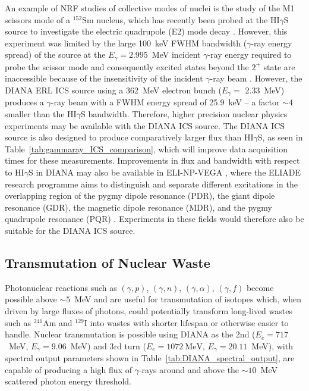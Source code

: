 \documentclass[../main.tex]{subfiles}
\begin{document}
An example of NRF studies of collective modes of nuclei is the study of the M1 scissors mode of a $^{152}\textrm{Sm}$ nucleus, which has recently been probed at the HI$\gamma$S source to investigate the electric quadrupole (E2) mode decay \cite{ide20212}. However, this experiment was limited by the large 100~\si{\kilo\electronvolt} FWHM bandwidth ($\gamma$-ray energy spread) \cite{ide20212} of the source at the $E_{\gamma} = 2.995$~\si{\mega\electronvolt} incident $\gamma$-ray energy required to probe the scissor mode \cite{ziegler1993low} and consequently excited states beyond the $2^{+}$ state are inaccessible because of the insensitivity of the incident $\gamma$-ray beam \cite{ide20212}. However, the DIANA ERL ICS source using a 362~\si{\mega\electronvolt} electron bunch ($E_{\gamma} =$ 2.33~\si{\mega\electronvolt}) produces a $\gamma$-ray beam with a FWHM energy spread of 25.9~\si{\kilo\electronvolt} -- a factor $\sim4$ smaller than the HI$\gamma$S bandwidth. Therefore, higher precision nuclear physics experiments may be available with the DIANA ICS source. The DIANA ICS source is also designed to produce comparatively larger flux than HI$\gamma$S, as seen in Table~\ref{tab:gammaray_ICS_comparison}, which will improve data acquisition times for these measurements. Improvements in flux and bandwidth with respect to HI$\gamma$S \cite{weller2009research} in DIANA may also be available in ELI-NP-VEGA \cite{elinp2019vega}, where the ELIADE research programme aims to distinguish and separate different excitations in the overlapping region of the pygmy dipole resonance (PDR), the giant dipole resonance (GDR), the magnetic dipole resonance (MDR), and the pygmy quadrupole resonance (PQR) \cite{tanaka2020current}. Experiments in these fields would therefore also be suitable for the DIANA ICS source.

\subsection{Transmutation of Nuclear Waste}

Photonuclear reactions such as $(\gamma,p)$, $(\gamma,n)$, $(\gamma,\alpha)$, $(\gamma,f)$ become possible above $\sim5$~\si{\mega\electronvolt} and are useful for transmutation of isotopes which, when driven by large fluxes of photons, could potentially transform long-lived wastes such as $^{241}\mathrm{Am}$ and $^{129}\mathrm{I}$ \cite{cho2016reconsideration} into wastes with shorter lifespan or otherwise easier to handle. Nuclear transmutation is possible using DIANA as the 2nd ($E_{e}=717$~\si{\mega\electronvolt}, $E_{\gamma}=9.06$~\si{\mega\electronvolt}) and 3rd turn ($E_{e}=1072~\si{\mega\electronvolt}$, $E_{\gamma}=20.11$~\si{\mega\electronvolt}), with spectral output parameters shown in Table~\ref{tab:DIANA_spectral_output}, are capable of producing a high flux of $\gamma$-rays around and above the $\sim10$~\si{\mega\electronvolt} scattered photon energy threshold.
\end{document}
